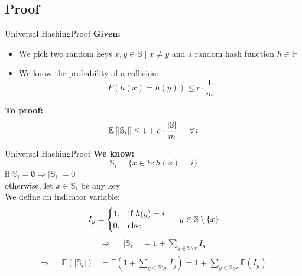 \subsection{Proof}
\def\E{\mathbb{E}}
\begin{frame}{Universal Hashing}{Proof}
  \textbf{Given:}
  \begin{itemize}
    \item<1->
      We pick two random keys {\color{Mittel-Blau}$x, y \in \mathbb{S} \mid x \neq y$} and
      a random hash function {\color{Mittel-Blau}$h \in \mathbb{H}$}
    \item<2->
      We know the probability of a collision:
      {\color{Mittel-Blau}\[P(h(x) = h(y)) \leq c \cdot \frac{1}{m}\]}
  \end{itemize}
  \textbf{To proof:}
  {\color{Mittel-Blau}\[\E\left[\vert \mathbb{S}_i \vert\right]
     \leq 1 + c \cdot \frac{\vert \mathbb{S} \vert}{m}
     \hspace*{1.5em} \forall \, i\]}
\end{frame}


\begin{frame}{Universal Hashing}{Proof}
  \textbf{We know:}
         {\color{Mittel-Blau}\[\mathbb{S}_i = \{x \in \mathbb{S}: h(x) = i\}\]}
         if {\color{Mittel-Blau}$\mathbb{S}_i = \emptyset \Rightarrow  \vert \mathbb{S}_i \vert = 0$}\\
         otherwise, let {\color{Mittel-Blau}$x \in \mathbb{S}_i$ be any key}\\
  We define an indicator variable:
  {\color{Mittel-Blau}
  \begin{displaymath}
    I_y = \begin{cases}
      1, & \text{if } h(y) = i\\
      0, & \text{else}
    \end{cases} \hspace*{1.5em} y \in \mathbb{S} \setminus \{x\}
  \end{displaymath}
  \begin{align*}
    \Rightarrow && \vert \mathbb{S}_i \vert
    & = 1 + \sum_{y \in \mathbb{S} \setminus x} I_y
  \end{align*}
  \begin{align*}
    \Rightarrow && \E\left(\vert \mathbb{S}_i \vert\right)
      & = \E\left(1 + \sum_{y \in \mathbb{S} \setminus x} I_y\right)
        = 1 + \sum_{y \in \mathbb{S} \setminus x} \E(I_y)
  \end{align*}}
\end{frame}

